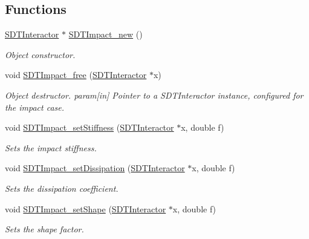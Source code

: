 \subsection*{Functions}
\begin{DoxyCompactItemize}
\item 
\hyperlink{group__interactor_gacd68aba5c96532193d9cbc8dfa8f1c8c}{S\+D\+T\+Interactor} $\ast$ \hyperlink{group__impact_gadf0b4c5f0d17362aa5ae3f33c21978c1}{S\+D\+T\+Impact\+\_\+new} ()
\begin{DoxyCompactList}\small\item\em Object constructor. \end{DoxyCompactList}\item 
\hypertarget{group__impact_ga4d8ff655b0456b661420118bf2ed5bba}{}void \hyperlink{group__impact_ga4d8ff655b0456b661420118bf2ed5bba}{S\+D\+T\+Impact\+\_\+free} (\hyperlink{group__interactor_gacd68aba5c96532193d9cbc8dfa8f1c8c}{S\+D\+T\+Interactor} $\ast$x)\label{group__impact_ga4d8ff655b0456b661420118bf2ed5bba}

\begin{DoxyCompactList}\small\item\em Object destructor. param\mbox{[}in\mbox{]} Pointer to a S\+D\+T\+Interactor instance, configured for the impact case. \end{DoxyCompactList}\item 
void \hyperlink{group__impact_ga2285e78c4be49f6d45b4add33dc5366b}{S\+D\+T\+Impact\+\_\+set\+Stiffness} (\hyperlink{group__interactor_gacd68aba5c96532193d9cbc8dfa8f1c8c}{S\+D\+T\+Interactor} $\ast$x, double f)
\begin{DoxyCompactList}\small\item\em Sets the impact stiffness. \end{DoxyCompactList}\item 
void \hyperlink{group__impact_ga91113280e3b346e3b6ff9ca17c3a551e}{S\+D\+T\+Impact\+\_\+set\+Dissipation} (\hyperlink{group__interactor_gacd68aba5c96532193d9cbc8dfa8f1c8c}{S\+D\+T\+Interactor} $\ast$x, double f)
\begin{DoxyCompactList}\small\item\em Sets the dissipation coefficient. \end{DoxyCompactList}\item 
void \hyperlink{group__impact_gaff2728768b2dec2ebe36ddb3f6e2105d}{S\+D\+T\+Impact\+\_\+set\+Shape} (\hyperlink{group__interactor_gacd68aba5c96532193d9cbc8dfa8f1c8c}{S\+D\+T\+Interactor} $\ast$x, double f)
\begin{DoxyCompactList}\small\item\em Sets the shape factor. \end{DoxyCompactList}\end{DoxyCompactItemize}



